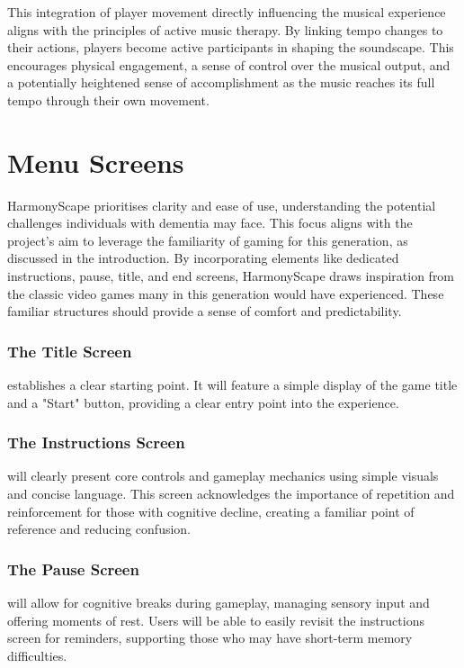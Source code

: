\documentclass{l4proj}
\begin{document}
This integration of player movement directly influencing the musical experience aligns with the principles of active music therapy. By linking tempo changes to their actions, players become active participants in shaping the soundscape. This encourages physical engagement, a sense of control over the musical output, and a potentially heightened sense of accomplishment as the music reaches its full tempo through their own movement.

\section{Menu Screens}
HarmonyScape prioritises clarity and ease of use, understanding the potential challenges individuals with dementia may face. This focus aligns with the project's aim to leverage the familiarity of gaming for this generation, as discussed in the introduction. By incorporating elements like dedicated instructions, pause, title, and end screens, HarmonyScape draws inspiration from the classic video games many in this generation would have experienced. These familiar structures should provide a sense of comfort and predictability.

\subsubsection{The Title Screen} establishes a clear starting point. It will feature a simple display of the game title and a "Start" button, providing a clear entry point into the experience.

\subsubsection{The Instructions Screen} will clearly present core controls and gameplay mechanics using simple visuals and concise language. This screen acknowledges the importance of repetition and reinforcement for those with cognitive decline, creating a familiar point of reference and reducing confusion.

\subsubsection{The Pause Screen} will allow for cognitive breaks during gameplay, managing sensory input and offering moments of rest. Users will be able to easily revisit the instructions screen for reminders, supporting those who may have short-term memory difficulties.
\end{document}
